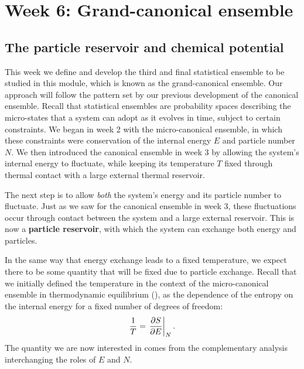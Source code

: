 \renewcommand{\thisweek}{MATH327 Week 6}
\renewcommand{\moddate}{Last modified 8 Mar.~2021}
\setcounter{section}{6}
\setcounter{subsection}{0}
{}
\section*{Week 6: Grand-canonical ensemble}
\subsection{The particle reservoir and chemical potential}
This week we define and develop the third and final statistical ensemble to be studied in this module, which is known as the grand-canonical ensemble.
Our approach will follow the pattern set by our previous development of the canonical ensemble.
Recall that statistical ensembles are probability spaces describing the micro-states that a system can adopt as it evolves in time, subject to certain constraints.
We began in week 2 with the micro-canonical ensemble, in which these constraints were conservation of the internal energy $E$ and particle number $N$.
We then introduced the canonical ensemble in week 3 by allowing the system's internal energy to fluctuate, while keeping its temperature $T$ fixed through thermal contact with a large external thermal reservoir.

The next step is to allow \textit{both} the system's energy and its particle number to fluctuate.
Just as we saw for the canonical ensemble in week 3, these fluctuations occur through contact between the system and a large external reservoir.
This is now a \textbf{particle reservoir}, with which the system can exchange both energy and particles.

In the same way that energy exchange leads to a fixed temperature, we expect there to be some quantity that will be fixed due to particle exchange.
Recall that we initially defined the temperature in the context of the micro-canonical ensemble in thermodynamic equilibrium (), as the dependence of the entropy on the internal energy for a fixed number of degrees of freedom:
\begin{equation*}
  \frac{1}{T} = \left. \frac{\partial S}{\partial E}\right|_N.
\end{equation*}
The quantity we are now interested in comes from the complementary analysis interchanging the roles of $E$ and $N$.

